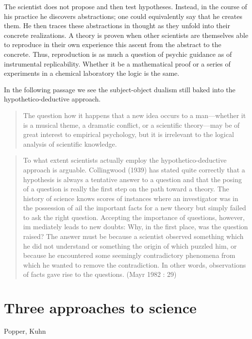 The scientist does not propose and then test hypotheses. Instead, in the course of his practice he discovers abstractions; one could equivalently say that he creates them. He then traces these abstractions in thought as they unfold into their concrete realizations. A theory is proven when other scientists are themselves able to reproduce in their own experience this ascent from the abstract to the concrete. Thus, reproduction is as much a question of psychic guidance as of instrumental replicability. Whether it be a mathematical proof or a series of experiments in a chemical laboratory the logic is the same.

In the following passage we see the subject-object dualism still baked into the hypothetico-deductive approach. 

\begin{quote}
The question how it happens that a new idea occurs to a man---whether it is a musical theme, a dramatic conflict, or a scientific theory---may be of great interest to empirical psychology, but it is irrelevant to the logical analysis of scientific knowledge. \citep[31]{Popper1959logic}
\end{quote}

\begin{quote}
To what extent scientists actually employ the hypothetico-deductive approach is arguable. Collingwood (1939) has stated quite correctly that a hypothesis is always a tentative answer to a question and that the posing of a question is really the first step on the path toward a theory. The history of science knows scores of instances where an investigator was in the possession of ail the important facts for a new theory but simply failed to ask the right question. Accepting the importance of questions, however, im­ mediately leads to new doubts: Why, in the first place, was the question raised? The answer must be because a scientist observed something which he did not understand or something the origin of which puzzled him, or because he encountered some seemingly contradictory phenomena from which he wanted to remove the contradiction. In other words, observations of facts gave rise to the questions. (Mayr 1982 : 29)
\end{quote}

\section{Three approaches to science}

Popper, Kuhn  

